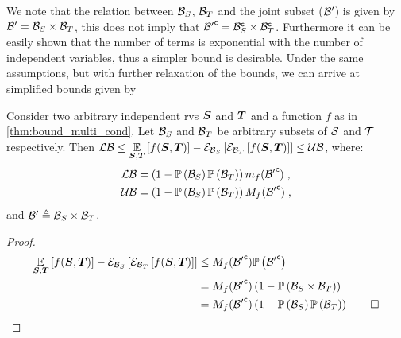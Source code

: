 We note that the relation between $\subSpaceI{\variable}$, $\subSpaceI{\variableI}$ and the joint subset ($\subSpace^\prime$) is given by $\subSpace^\prime=\subSpaceI{\variable}\times\subSpaceI{\variableI}$, this does not imply that $\stcomp{\subSpace^\prime}=\stcompI{\subSpace}{\variable}\times\stcompI{\subSpace}{\variableI}$. Furthermore it can be easily shown that the number of terms is exponential with the number of independent variables, thus a simpler bound is desirable. Under the same assumptions, but with further relaxation of the bounds, we can arrive at simplified bounds given by

\begin{proposition}
	\label{thm:bound_multi_ind_2}
	Consider two arbitrary independent \glspl{rv} $\RV$ and $\RVI$ and a function $f$ as in \autoref{thm:bound_multi_cond}. Let $\subSpaceI{\variable}$ and $\subSpaceI{\variableI}$ be arbitrary subsets of $\Space$ and $\SpaceI$ respectively. Then $\lowerbound\leq\expectation{f(\RV,\RVI)}{\RV,\RVI}-\partialexpectation{\partialexpectation{f(\RV,\RVI)}{\subSpaceI{\variableI}}}{\subSpaceI{\variable}}\leq\upperbound$, where:
	\begin{subequations}
		\begin{align}
			\lowerbound & = \left(1-\measure{\subSpaceI{\variable}}\measure{\subSpaceI{\variableI}}\right)m_f(\stcomp{\subSpace^\prime})\;, \\
			\upperbound & = \left(1-\measure{\subSpaceI{\variable}}\measure{\subSpaceI{\variableI}}\right)M_f(\stcomp{\subSpace^\prime})\;,
		\end{align}
	\end{subequations}
	and $\subSpace^\prime\triangleq\subSpaceI{\variable}\times\subSpaceI{\variableI}$.
\end{proposition}
\begin{proof}
	\begin{align*}
		\expectation{f(\RV,\RVI)}{\RV,\RVI}-\partialexpectation{\partialexpectation{f(\RV,\RVI)}{\subSpaceI{\variableI}}}{\subSpaceI{\variable}} & \leq M_f(\stcomp{\subSpace^\prime})\measure{\stcomp{\subSpace^\prime}}                                            \\
		& =M_f(\stcomp{\subSpace^\prime})\left(1-\measure{\subSpaceI{\variable}\times\subSpaceI{\variableI}}\right)         \\
		& =M_f(\stcomp{\subSpace^\prime})\left(1-\measure{\subSpaceI{\variable}}\measure{\subSpaceI{\variableI}}\right)\qed
	\end{align*}
\end{proof}

